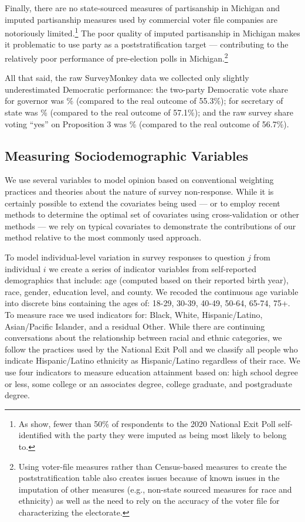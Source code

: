 Finally, there are no state-sourced measures of partisanship in Michigan and imputed partisanship measures used by commercial voter file companies are notoriously limited.\footnote{As \citet{CLT:2022} show, fewer than 50\% of respondents to the 2020 National Exit Poll self-identified with the party they were imputed as being most likely to belong to.}
The poor quality of imputed partisanship in Michigan makes it problematic to use party as a poststratification target --- contributing to the relatively poor performance of pre-election polls in Michigan.\footnote{Using voter-file measures rather than Census-based measures to create the poststratification table also creates issues because of known issues in the imputation of other measures (e.g., non-state sourced measures for race and ethnicity) as well as the need to rely on the accuracy of the voter file for characterizing the electorate.}


All that said, the raw SurveyMonkey data we collected only slightly underestimated Democratic performance: the two-party Democratic vote share for governor was \% (compared to the real outcome of 55.3\%); for secretary of state was \% (compared to the real outcome of 57.1\%); and the raw survey share voting ``yes'' on Proposition 3 was \% (compared to the real outcome of 56.7\%).

\subsection{Measuring Sociodemographic Variables}
\label{apx:surveymeasure}
We use several variables to model opinion based on conventional weighting practices and theories about the nature of survey non-response.
While it is certainly possible to extend the covariates being used --- or to employ recent methods to determine the optimal set of covariates using cross-validation or other methods --- we rely on typical covariates to demonstrate the contributions of our method relative to the most commonly used approach.

To model individual-level variation in survey responses to question $j$ from individual $i$ we create a series of indicator variables from self-reported demographics that include: age (computed based on their reported birth year), race, gender, education level, and county. 
We recoded the continuous age variable into discrete bins containing the ages of: 18-29, 30-39, 40-49, 50-64, 65-74, 75+. 
To measure race we used indicators for: Black, White, Hispanic/Latino, Asian/Pacific Islander, and a residual Other. 
While there are continuing conversations about the relationship between racial and ethnic categories, we follow the practices used by the National Exit Poll and we classify all people who indicate Hispanic/Latino ethnicity as Hispanic/Latino regardless of their race. 
We use four indicators to measure education attainment based on: high school degree or less, some college or an associates degree, college graduate, and postgraduate degree.


